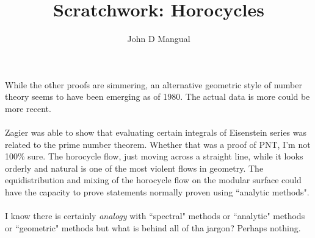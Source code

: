 \documentclass[12pt]{article}
\title{Scratchwork: Horocycles}
\author{John D Mangual}
\date{}
\begin{document}
\selectfont \fontsize{12.5}{15}\selectfont

\maketitle

\noindent While the other proofs are simmering, an alternative geometric style of number theory seems to have been emerging as of 1980.  The actual data is more could be more recent.  \\ \\
Zagier was able to show that evaluating certain integrals of Eisenstein series was related to the prime number theorem.  Whether that was a proof of PNT, I'm not 100\% sure.  The horocycle flow, just moving across a straight line, while it looks orderly and natural is one of the most violent flows in geometry.  The equidistribution and mixing of the horocycle flow on the modular surface could have the capacity to prove statements normally proven using ``analytic methods". \\ \\
I know there is certainly \textit{analogy} with ``spectral" methods or ``analytic" methods or ``geometric" methods but what is behind all of tha jargon?  Perhaps nothing.
\end{document}
